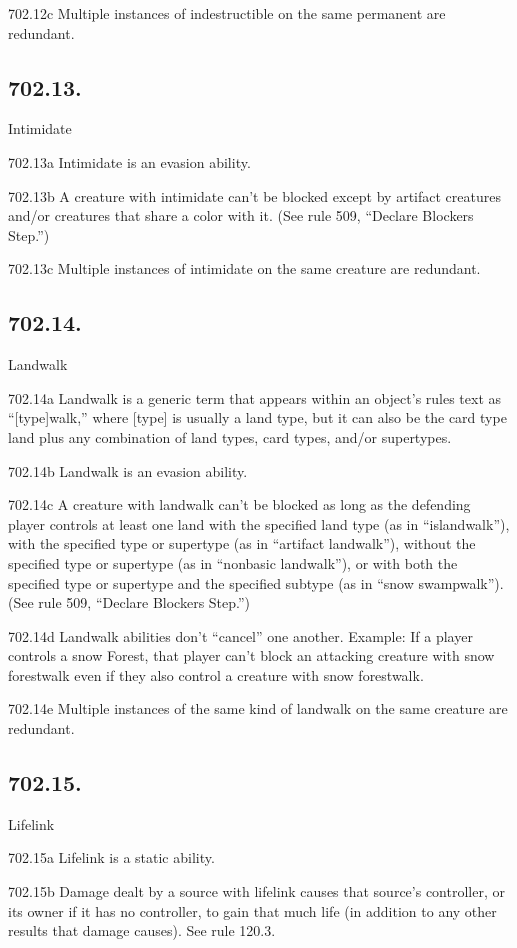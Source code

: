 702.12c Multiple instances of indestructible on the same permanent are redundant.

\subsection*{702.13.}
Intimidate

702.13a Intimidate is an evasion ability.

702.13b A creature with intimidate can’t be blocked except by artifact creatures and/or creatures that share a color with it. (See rule 509, “Declare Blockers Step.”)

702.13c Multiple instances of intimidate on the same creature are redundant.

\subsection*{702.14.}
Landwalk

702.14a Landwalk is a generic term that appears within an object’s rules text as “[type]walk,” where [type] is usually a land type, but it can also be the card type land plus any combination of land types, card types, and/or supertypes.

702.14b Landwalk is an evasion ability.

702.14c A creature with landwalk can’t be blocked as long as the defending player controls at least one land with the specified land type (as in “islandwalk”), with the specified type or supertype (as in “artifact landwalk”), without the specified type or supertype (as in “nonbasic landwalk”), or with both the specified type or supertype and the specified subtype (as in “snow swampwalk”). (See rule 509, “Declare Blockers Step.”)

702.14d Landwalk abilities don’t “cancel” one another.
Example: If a player controls a snow Forest, that player can’t block an attacking creature with snow forestwalk even if they also control a creature with snow forestwalk.

702.14e Multiple instances of the same kind of landwalk on the same creature are redundant.

\subsection*{702.15.}
Lifelink

702.15a Lifelink is a static ability.

702.15b Damage dealt by a source with lifelink causes that source’s controller, or its owner if it has no controller, to gain that much life (in addition to any other results that damage causes). See rule 120.3.

